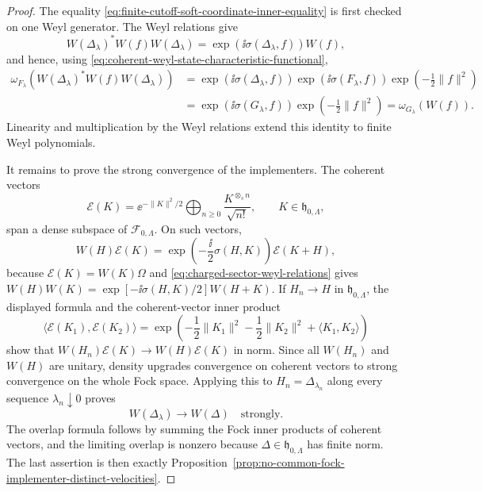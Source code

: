 \begin{proof}
The equality \eqref{eq:finite-cutoff-soft-coordinate-inner-equality} is first
checked on one Weyl generator.  The Weyl relations give
\[
  W(\Delta_{\lambda})^*W(f)W(\Delta_{\lambda})
  =
  \exp\!\left(\ii\sigma(\Delta_{\lambda},f)\right)W(f),
\]
and hence, using
\eqref{eq:coherent-weyl-state-characteristic-functional},
\[
\begin{aligned}
  \omega_{F_{\lambda}}\!\left(
    W(\Delta_{\lambda})^*W(f)W(\Delta_{\lambda})
  \right)
  &=
  \exp\!\left(\ii\sigma(\Delta_{\lambda},f)\right)
  \exp\!\left(\ii\sigma(F_{\lambda},f)\right)
  \exp\!\left(-\frac12\|f\|^2\right)
\\
  &=
  \exp\!\left(\ii\sigma(G_{\lambda},f)\right)
  \exp\!\left(-\frac12\|f\|^2\right)
  =
  \omega_{G_{\lambda}}(W(f)).
\end{aligned}
\]
Linearity and multiplication by the Weyl relations extend this identity to
finite Weyl polynomials.

It remains to prove the strong convergence of the implementers.  The coherent
vectors
\[
  \mathcal E(K)
  =
  \ee^{-\|K\|^2/2}
  \bigoplus_{n\ge0}\frac{K^{\otimes_s n}}{\sqrt{n!}},
  \qquad K\in\mathfrak h_{0,\Lambda},
\]
span a dense subspace of \(\mathcal F_{0,\Lambda}\).  On such vectors,
\[
  W(H)\mathcal E(K)
  =
  \exp\!\left(-\frac{\ii}{2}\sigma(H,K)\right)
  \mathcal E(K+H),
\]
because \(\mathcal E(K)=W(K)\Omega\) and
\eqref{eq:charged-sector-weyl-relations} gives
\(W(H)W(K)=\exp[-\ii\sigma(H,K)/2]W(H+K)\).  If \(H_n\to H\) in
\(\mathfrak h_{0,\Lambda}\), the displayed formula and the coherent-vector
inner product
\[
  \langle\mathcal E(K_1),\mathcal E(K_2)\rangle
  =
  \exp\!\left(
    -\frac12\|K_1\|^2-\frac12\|K_2\|^2+\langle K_1,K_2\rangle
  \right)
\]
show that \(W(H_n)\mathcal E(K)\to W(H)\mathcal E(K)\) in norm.  Since all
\(W(H_n)\) and \(W(H)\) are unitary, density upgrades convergence on coherent
vectors to strong convergence on the whole Fock space.  Applying this to
\(H_n=\Delta_{\lambda_n}\) along every sequence
\(\lambda_n\downarrow0\) proves
\[
  W(\Delta_{\lambda})\to W(\Delta)
  \quad\text{strongly}.
\]
The overlap formula follows by summing the Fock inner products of coherent
vectors, and the limiting overlap is nonzero because
\(\Delta\in\mathfrak h_{0,\Lambda}\) has finite norm.  The last assertion is
then exactly
Proposition~\ref{prop:no-common-fock-implementer-distinct-velocities}.
\end{proof}

